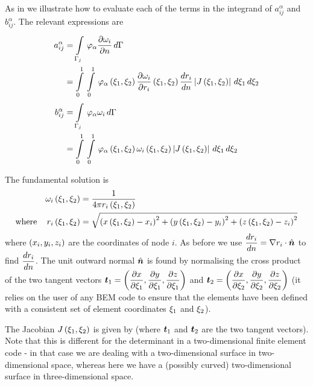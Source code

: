 As in  we illustrate how to evaluate each of the
terms in the integrand of $a_{ij}^{\alpha}$ and $b_{ij}^{\alpha}$.  The
relevant expressions are
\begin{align}
  a_{ij}^{\alpha} &=   \displaystyle\int\limits_{\Gamma_{j}}^{} \, \varphi_{\alpha} 
     \dfrac{\partial \omega_{i}}{\partial n} \,d\Gamma  \nonumber \\ &=
    \displaystyle\int\limits_{0}^{1} \,  \displaystyle\int\limits_{0}^{1} \,  \varphi_{\alpha} \left( \xi_{1},\xi_{2} \right) 
        \dfrac{\partial \omega_{i}}{\partial r_{i}} \left( \xi_{1},\xi_{2} \right)   \dfrac{ d r_{i}}{d n} 
      \left|  J\left( \xi_{1},\xi_{2} \right)  \right|\,d\xi_{1} \,d\xi_{2}  \\ 
  b_{ij}^{\alpha}
  &=   \displaystyle\int\limits_{\Gamma_{j}}^{} \, \varphi_{\alpha}  \omega_{i}\,d\Gamma  \nonumber \\ 
  &=   \displaystyle\int\limits_{0}^{1} \,  \displaystyle\int\limits_{0}^{1} \,  \varphi_{\alpha} \left( \xi_{1},\xi_{2} \right) 
       \omega_{i}\left( \xi_{1},\xi_{2} \right)  \left|  J\left( \xi_{1},\xi_{2} \right)  \right|\,d\xi_{1} \,d\xi_{2} 
\end{align}

The fundamental solution is 
\begin{alignat*}{2}
  &&  \omega_{i}\left( \xi_{1},\xi_{2} \right)  &= \dfrac{1}{4 \pi
     r_{i}\left( \xi_{1},\xi_{2} \right) } \\ \text{where} &&  r_{i}\left( \xi_{1},\xi_{2} \right) 
  &= \sqrt{\left(  x\left( \xi_{1},\xi_{2} \right) -x_{i} \right)^{2} +
    \left(  y\left( \xi_{1},\xi_{2} \right) -y_{i} \right)^{2} +
    \left(  z\left( \xi_{1},\xi_{2} \right) -z_{i} \right)^{2}}
\end{alignat*}
where $\left( x_{i},y_{i},z_{i} \right)$ are the coordinates of node $i$.  As before
we use $ \dfrac{ d r_{i}}{d n}  = \nabla r_{i}\cdot\hat{\boldsymbol{n}}$ to find
$ \dfrac{ d r_{i}}{d n} $.  The unit outward normal $\hat{\boldsymbol{n}}$ is found by
normalising the cross product of the two tangent vectors $\boldsymbol{t}_{1} =
\left(  \dfrac{\partial x}{\partial \xi_{1}} ,  \dfrac{\partial y}{\partial \xi_{1}} , \dfrac{\partial z}{\partial \xi_{1}}  \right)$ and
$\boldsymbol{t}_{2} = \left(  \dfrac{\partial x}{\partial \xi_{2}} , \dfrac{\partial y}{\partial \xi_{2}} , \dfrac{\partial z}{\partial \xi_{2}} 
 \right)$ (it relies on the user of any BEM code to ensure that the elements
have been defined with a consistent set of element coordinates $\xi_{1}$ and
$\xi_{2}$).

The Jacobian $ J\left( \xi_{1},\xi_{2} \right) $ is given by  (where $\boldsymbol{t}_{1}$ and $\boldsymbol{t}_{2}$ are the two tangent
vectors).  Note that this is different for the determinant in a
two-dimensional finite element code - in that case we are dealing with a
two-dimensional surface in two-dimensional space, whereas here we have a
(possibly curved) two-dimensional surface in three-dimensional space.

